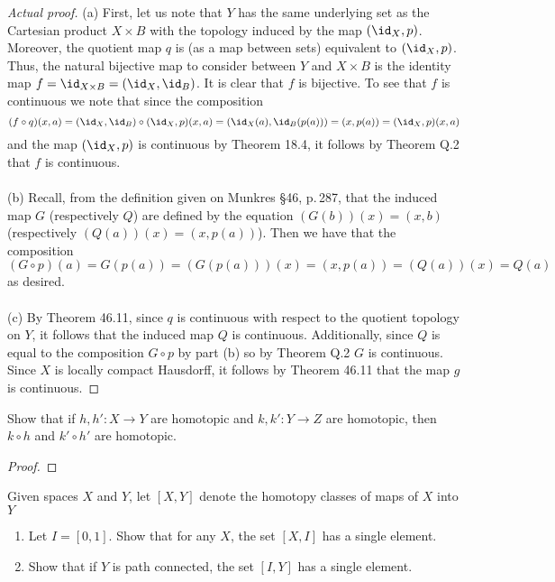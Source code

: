 \begin{proof}[Actual proof]
(a) First, let us note that $Y$ has the same underlying set as
the Cartesian product $X\times B$ with the topology induced by
the map $(\id_X,p)$. Moreover, the quotient map $q$ is (as a map
between sets) equivalent to $(\id_X,p)$. Thus, the natural
bijective map to consider between $Y$ and $X\times B$ is the
identity map $f=\id_{X\times B}=(\id_X,\id_B)$. It is clear that
$f$ is bijective. To see that $f$ is continuous we note that
since the composition
\[
(f\circ q)(x,a)
=(\id_X,\id_B)\circ(\id_X,p)(x,a)
=(\id_X(a),\id_B(p(a)))
=(x,p(a))
=(\id_X,p)(x,a)
\]
and the map $(\id_X,p)$ is continuous by Theorem 18.4, it
follows by Theorem Q.2 that $f$ is continuous.
\\\\
(b) Recall, from the definition given on Munkres \S46, p.\,287,
that the induced map $G$ (respectively $Q$) are defined by the
equation $(G(b))(x)=(x,b)$ (respectively
$(Q(a))(x)=(x,p(a))$). Then we have that the composition
\[
(G\circ p)(a)=G(p(a))=(G(p(a)))(x)=(x,p(a))=(Q(a))(x)=Q(a)
\]
as desired.
\\\\
(c) By Theorem 46.11, since $q$ is continuous with respect to the
quotient topology on $Y$, it follows that the induced map $Q$ is
continuous. Additionally, since $Q$ is equal to the composition
$G\circ p$ by part (b) so by Theorem Q.2 $G$ is continuous. Since
$X$ is locally compact Hausdorff, it follows by Theorem 46.11
that the map $g$ is continuous.
\end{proof}
\newpage
\begin{problem}[Munkres \S51, Ex.\,1]
Show that if $h,h'\colon X\to Y$ are homotopic and $k,k'\colon
Y\to Z$ are homotopic, then $k\circ h$ and $k'\circ h'$ are
homotopic.
\end{problem}
\begin{proof}
\end{proof}
\newpage
\begin{problem}[Munkres \S51, Ex.\,2]
Given spaces $X$ and $Y$, let $[X,Y]$ denote the homotopy classes
of maps of $X$ into $Y$
\begin{enumerate}[label=(\alph*)]
\item Let $I=[0,1]$. Show that for any $X$, the set $[X,I]$ has a
  single element.
\item Show that if $Y$ is path connected, the set $[I,Y]$ has a
  single element.
\end{enumerate}
\end{problem}
